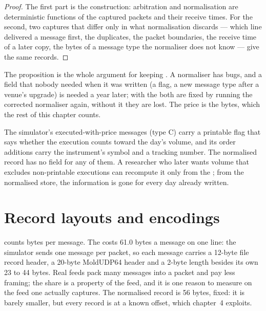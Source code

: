 \begin{proof}
The first part is the construction: arbitration and normalisation are deterministic functions of the captured packets and their
receive times. For the second, two captures that differ only in what normalisation discards --- which line delivered a message
first, the duplicates, the packet boundaries, the receive time of a later copy, the bytes of a message type the normaliser does
not know --- give the same records.
\end{proof}

The proposition is the whole argument for keeping . A normaliser has bugs, and a field that nobody needed when it was
written (a flag, a new message type after a venue's upgrade) is needed a year later; with the  both are fixed by
running the corrected normaliser again, without it they are lost. The price is the bytes, which the rest of this chapter
counts.

\begin{example}\label{ex:pl:capturing-and-storing-tick-data:field}
The simulator's executed-with-price messages (type C) carry a printable flag that says whether the execution counts toward the
day's volume, and its order additions carry the instrument's symbol and a tracking number. The normalised record has no field for
any of them. A researcher who later wants volume that excludes non-printable executions can recompute
it only from the ; from the normalised store, the information is gone for every day already written.
\end{example}

\section{Record layouts and encodings}

 counts bytes per message. The  costs 61.0 bytes a message on one
line: the simulator sends one message per packet, so each message carries a 12-byte file record header, a 20-byte MoldUDP64
header and a 2-byte length besides its own 23 to 44 bytes. Real feeds pack many messages into a packet and pay less framing;
the share is a property of the feed, and it is one reason to measure on the feed one actually captures. The normalised record is
56 bytes, fixed: it is barely smaller, but every record is at a known offset, which chapter~4 exploits.

